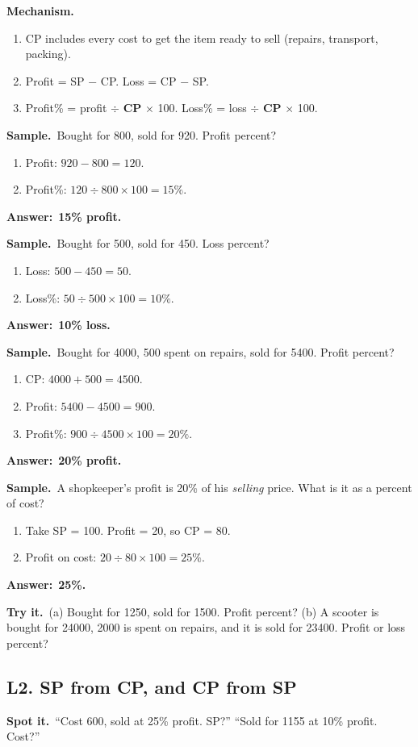 \documentclass[11pt,a4paper]{article}
\let\oldsubsection\subsection
\renewcommand{\subsection}{\needspace{9\baselineskip}\oldsubsection}
\newcommand{\spot}{\textbf{\color{ember}Spot it.}\ }
\newcommand{\mech}{\textbf{\color{ember}Mechanism.}\ }
\newif\ifkeepsamp
\newcommand{\ans}[1]{\par\nopagebreak\noindent\textbf{\color{ember}Answer:}\ \textbf{#1}\par}
\newcommand{\samp}{\ifkeepsamp\needspace{4\baselineskip}\fi\textbf{\color{ember}Sample.}\ }
\newcommand{\tryit}[1]{\textbf{\color{ember}Try it.}\ #1}
\begin{document}
\mech
\begin{enumerate}
\item CP includes every cost to get the item ready to sell (repairs, transport, packing).
\item Profit = SP $-$ CP. Loss = CP $-$ SP.
\item Profit\% = profit $\div$ \textbf{CP} $\times$ 100. Loss\% = loss $\div$ \textbf{CP} $\times$ 100.
\end{enumerate}

\samp Bought for 800, sold for 920. Profit percent?
\begin{enumerate}
\item Profit: $920 - 800 = 120$.
\item Profit\%: $120 \div 800 \times 100 = 15\%$.
\end{enumerate}
\ans{15\% profit.}

\samp Bought for 500, sold for 450. Loss percent?
\begin{enumerate}
\item Loss: $500 - 450 = 50$.
\item Loss\%: $50 \div 500 \times 100 = 10\%$.
\end{enumerate}
\ans{10\% loss.}

\samp Bought for 4000, 500 spent on repairs, sold for 5400. Profit percent?
\begin{enumerate}
\item CP: $4000 + 500 = 4500$.
\item Profit: $5400 - 4500 = 900$.
\item Profit\%: $900 \div 4500 \times 100 = 20\%$.
\end{enumerate}
\ans{20\% profit.}

\samp A shopkeeper's profit is 20\% of his \emph{selling} price. What is it as a percent of cost?
\begin{enumerate}
\item Take SP = 100. Profit = 20, so CP = 80.
\item Profit on cost: $20 \div 80 \times 100 = 25\%$.
\end{enumerate}
\ans{25\%.}

\tryit (a) Bought for 1250, sold for 1500. Profit percent? (b) A scooter is bought for 24000, 2000 is spent on repairs, and it is sold for 23400. Profit or loss percent?

\subsection{L2. SP from CP, and CP from SP}
\spot ``Cost 600, sold at 25\% profit. SP?'' ``Sold for 1155 at 10\% profit. Cost?''
\end{document}
